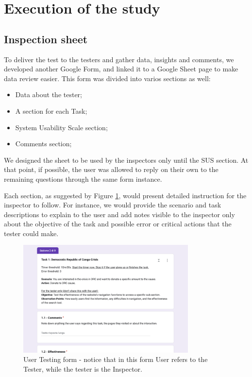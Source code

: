 \section{Execution of the study}
\subsection{Inspection sheet}
To deliver the test to the testers and gather data, insights and comments, we developed another Google Form, and linked it to a Google Sheet page to make data review easier. This form was divided into varios sections as well:
\begin{itemize}
	\item Data about the tester;
	\item A section for each Task;
	\item System Usability Scale section;
	\item Comments section;
\end{itemize}
We designed the sheet to be used by the inspectors only until the SUS section. At that point, if possible, the user was allowed to reply on their own to the remaining questions through the same form instance.

Each section, as suggested by Figure \ref{fig:testing_form}, would present detailed instruction for the inspector to follow. For instance, we would provide the scenario and task descriptions to explain to the user and add notes visible to the inspector only about the objective of the task and possible error or critical actions that the tester could make.

\begin{figure}[h]
	\centering
	\includegraphics[width=0.8\textwidth]{img/testing_form.png}
	\caption{User Testing form - notice that in this form User refers to the Tester, while the tester is the Inspector.}
	\label{fig:testing_form}
\end{figure}

